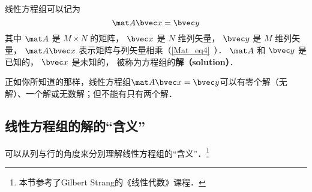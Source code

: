 
\begin{issues}
\issueDraft
\end{issues}


线性方程组可以记为
\begin{equation}\label{LinEq_eq1}
\mat A \bvec x = \bvec y
\end{equation}
其中 $\mat A$ 是 $M \times N$ 的矩阵， $\bvec x$ 是 $N$ 维列矢量， $\bvec y$ 是 $M$ 维列矢量， $\mat A \bvec x$ 表示矩阵与列矢量相乘（\autoref{Mat_eq4}~）． $\mat A$ 和 $\bvec y$ 是已知的， $\bvec x$ 是未知的， 被称为方程组的\textbf{解（solution）}．

正如你所知道的那样，线性方程组$\mat A \bvec x=\bvec y$可以有零个解（无解）、一个解或无数解；但不能有只有两个解．


\subsection{线性方程组的解的“含义”}
可以从列与行的角度来分别理解线性方程组的“含义”．\footnote{本节参考了Gilbert Strang的《线性代数》课程．}
